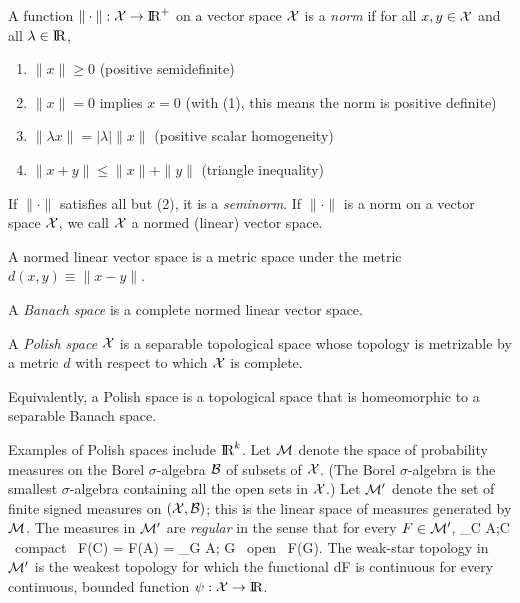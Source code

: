 \begin{Definition}
    A function $\| \cdot \|: {\cal X} \rightarrow \hbox{I\kern-.17em\hbox{R}}^+$ on a vector space ${\cal X}$
    is a {\em norm\/} if for all $x, y \in {\cal X}$ and all $\lambda \in \hbox{I\kern-.17em\hbox{R}}$,
    \begin{enumerate}
        \item $\| x \| \ge 0$ (positive semidefinite)
        \item $\| x \| = 0$ implies $x = 0$ (with (1), this means the norm is positive definite)
        \item $\| \lambda x \| = | \lambda | \| x \|$ (positive scalar homogeneity)
        \item $\| x + y \| \le \|x\| + \|y\|$ (triangle inequality)
    \end{enumerate}
    If $\| \cdot \|$ satisfies all but (2), it is a {\em seminorm\/}.
    If $\| \cdot \|$ is a norm on a vector space ${\cal X}$, we call ${\cal X}$ a
    normed (linear) vector space.
\end{Definition}

A normed linear vector space is a metric space under the metric $d(x, y) \equiv \| x-y\|$.

\begin{Definition}
    A {\em Banach space\/} is a complete normed linear vector space.
\end{Definition}

\begin{Definition}
    A {\em Polish space} ${\cal X}$ is a separable
    topological space whose topology is metrizable
    by a metric $d$ with respect to which ${\cal X}$ is complete.
\end{Definition}

Equivalently, a Polish space is a topological space that is homeomorphic
to a separable Banach space.

Examples of Polish spaces include $\hbox{I\kern-.17em\hbox{R}}^k$.
Let ${\cal M}$ denote the space of probability measures on the Borel $\sigma$-algebra
${\cal B}$ of subsets of ${\cal X}$. 
(The Borel $\sigma$-algebra is the smallest $\sigma$-algebra containing
all the open sets in ${\cal X}$.)
Let ${\cal M}'$ denote the set of finite signed measures on  $({\cal X}, {\cal B})$; this is
the linear space of measures generated by ${\cal M}$.
The measures in ${\cal M}'$ are {\em regular} in the sense that for every $F \in {\cal M}'$,
\beq
    \sup_{C \subset A;\;C \mbox{ compact }} F(C) = F(A) = \inf_{G \supset A; \; G \mbox{ open }}
    F(G).
\eeq
The weak-star topology in ${\cal M}'$ is the weakest topology for which the functional
\beq
    \int \psi dF
\eeq
is continuous for every continuous, bounded function $\psi: {\cal X} \rightarrow \hbox{I\kern-.17em\hbox{R}}$.

